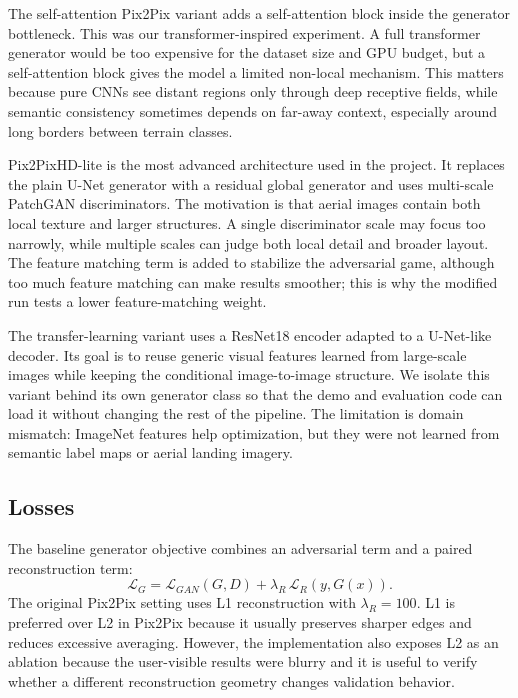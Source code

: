 \documentclass[conference]{IEEEtran}
\begin{document}
The self-attention Pix2Pix variant adds a self-attention block inside the generator bottleneck. This was our transformer-inspired experiment. A full transformer generator would be too expensive for the dataset size and GPU budget, but a self-attention block gives the model a limited non-local mechanism. This matters because pure CNNs see distant regions only through deep receptive fields, while semantic consistency sometimes depends on far-away context, especially around long borders between terrain classes.

Pix2PixHD-lite is the most advanced architecture used in the project. It replaces the plain U-Net generator with a residual global generator and uses multi-scale PatchGAN discriminators. The motivation is that aerial images contain both local texture and larger structures. A single discriminator scale may focus too narrowly, while multiple scales can judge both local detail and broader layout. The feature matching term is added to stabilize the adversarial game, although too much feature matching can make results smoother; this is why the modified run tests a lower feature-matching weight.

The transfer-learning variant uses a ResNet18 encoder adapted to a U-Net-like decoder. Its goal is to reuse generic visual features learned from large-scale images while keeping the conditional image-to-image structure. We isolate this variant behind its own generator class so that the demo and evaluation code can load it without changing the rest of the pipeline. The limitation is domain mismatch: ImageNet features help optimization, but they were not learned from semantic label maps or aerial landing imagery.

\subsection{Losses}
The baseline generator objective combines an adversarial term and a paired reconstruction term:
\begin{equation}
\mathcal{L}_{G}=\mathcal{L}_{GAN}(G,D)+\lambda_R\,\mathcal{L}_{R}(y,G(x)).
\end{equation}
The original Pix2Pix setting uses L1 reconstruction with $\lambda_R=100$. L1 is preferred over L2 in Pix2Pix because it usually preserves sharper edges and reduces excessive averaging. However, the implementation also exposes L2 as an ablation because the user-visible results were blurry and it is useful to verify whether a different reconstruction geometry changes validation behavior.
\end{document}
